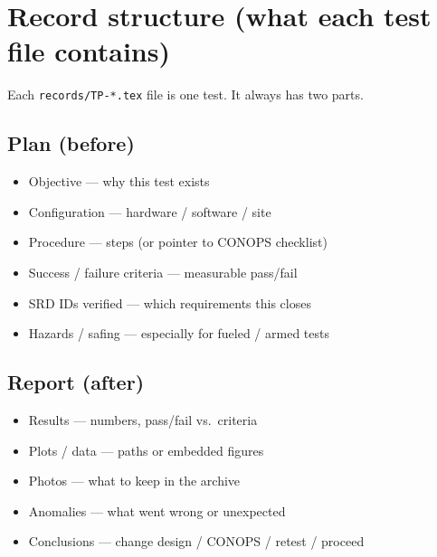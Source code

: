 \section{Record structure (what each test file contains)}
\label{sec:record-guide}

Each \texttt{records/TP-*.tex} file is one test. It always has two parts.

\subsection{Plan (before)}

\begin{itemize}
  \item Objective --- why this test exists
  \item Configuration --- hardware / software / site
  \item Procedure --- steps (or pointer to CONOPS checklist)
  \item Success / failure criteria --- measurable pass/fail
  \item SRD IDs verified --- which requirements this closes
  \item Hazards / safing --- especially for fueled / armed tests
\end{itemize}

\subsection{Report (after)}

\begin{itemize}
  \item Results --- numbers, pass/fail vs.\ criteria
  \item Plots / data --- paths or embedded figures
  \item Photos --- what to keep in the archive
  \item Anomalies --- what went wrong or unexpected
  \item Conclusions --- change design / CONOPS / retest / proceed
\end{itemize}

